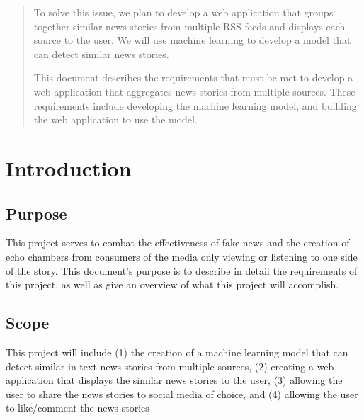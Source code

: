 \documentclass[onecolumn, draftclsnofoot,10pt, compsoc]{IEEEtran}
\begin{document}
\begin{titlepage}
\begin{singlespace}
\begin{abstract}
        To solve this issue, we plan to develop a web application that groups together similar news stories from multiple RSS feeds and displays each source to the user. We will use machine learning to develop a model that can detect similar news stories.\par
        This document describes the requirements that must be met to develop a web application that aggregates news stories from multiple sources. These requirements include developing the machine learning model, and building the web application to use the model. 
        \end{abstract}     
    \end{singlespace}
\end{titlepage}
\newpage
{}
\tableofcontents
\clearpage

\section{Introduction}
\subsection{Purpose}
This project serves to combat the effectiveness of fake news and the creation of echo chambers from consumers of the media only viewing or listening to one side of the story. This document's purpose is to describe in detail the requirements of this project, as well as give an overview of what this project will accomplish.
\subsection{Scope}
This project will include (1) the creation of a machine learning model that can detect similar in-text news stories from multiple sources, (2) creating a web application that displays the similar news stories to the user, (3) allowing the user to share the news stories to social media of choice, and (4) allowing the user to like/comment the news stories
\end{document}
